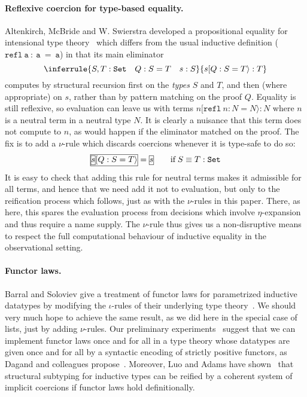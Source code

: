 \paragraph{Reflexive coercion for type-based equality.} Altenkirch,
McBride and W. Swierstra developed a propositional equality for
intensional type theory~\cite{ObsEq} which differs from the usual inductive
definition ($\mathtt{refl~a~:~a~=~a}$) in that its main eliminator
\[
\inferrule{S,T : \mathtt{Set}\quad Q : S = T\quad s : S}
          {s[Q:S=T\rangle : T}
\]
computes by structural recursion first on the \emph{types}
$S$ and $T$, and then (where appropriate) on $s$, rather than
by pattern matching on the proof $Q$. Equality is still
reflexive, so evaluation can leave us with terms
$n[\mathtt{refl}\:n:N=N\rangle : N$
where $n$ is a neutral term in a neutral type $N$. It is clearly
a nuisance that this term does not compute to $n$, as would happen
if the eliminator matched on the proof. The fix is to add a
$\nu$-rule which discards coercions whenever it is type-safe to do so:
\[
  \fbb{\fba{$s$}$[Q:S=T\rangle$} = \fba{$s$}\qquad \mbox{if}\;S\equiv T:\mathtt{Set}
\]
It is easy to check that adding this rule for neutral terms makes it
admissible for all terms, and hence that we need add it not to
evaluation, but only to the reification process which follows, just
as with the $\nu$-rules in this paper. There, as here, this spares
the evaluation process from decisions which involve $\eta$-expansion
and thus require a name supply. The $\nu$-rule thus gives us a non-disruptive
means to respect the full computational behaviour of inductive equality
in the observational setting.

\paragraph{Functor laws.} Barral and Soloviev give a treatment of
functor laws for parametrized inductive datatypes by modifying the
$\iota$-rules of their underlying type
theory~\cite{DBLP:conf/csr/BarralS06}.  We should very much hope to
achieve the same result, as we did here in the special case of lists,
just by adding $\nu$-rules. Our preliminary
experiments~\cite{PigWeekNu} suggest that we can implement functor
laws once and for all in a type theory whose datatypes are given once
and for all by a syntactic encoding of strictly positive functors, as
Dagand and colleagues propose~\cite{epigram,ElabData}.  Moreover, Luo
and Adams have shown~\cite{DBLP:journals/mscs/LuoA08} that structural
subtyping for inductive types can be reified by a coherent system of
implicit coercions if functor laws hold definitionally.

